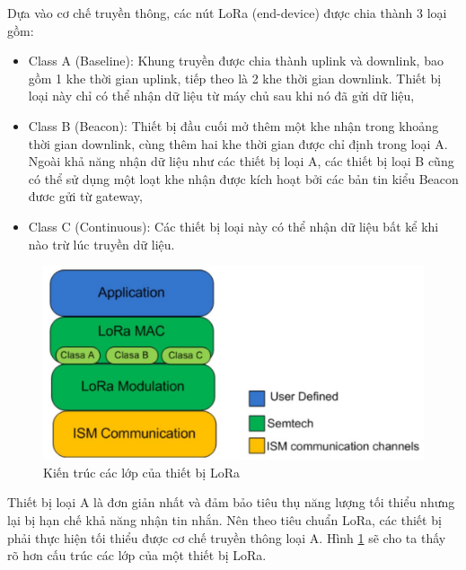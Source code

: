 \par 
Dựa vào cơ chế truyền thông, các nút LoRa (end-device) được chia thành 3 loại \cite{4} gồm:
\begin{itemize}
\item	Class A (Baseline): Khung truyền được chia thành uplink và downlink, bao gồm 1 khe thời gian uplink, tiếp theo là 2 khe thời gian downlink. Thiết bị loại này chỉ có thể nhận dữ liệu từ máy chủ sau khi nó đã gửi dữ liệu,
\item Class B (Beacon): Thiết bị đầu cuối mở thêm một khe nhận trong khoảng thời gian downlink, cùng thêm hai khe thời gian được chỉ định trong loại A. Ngoài khả năng nhận dữ liệu như các thiết bị loại A, các thiết bị loại B cũng có thể sử dụng một loạt khe nhận được kích hoạt bởi các bản tin kiểu Beacon đươc gửi từ gateway,
\item	Class C (Continuous): Các thiết bị loại này có thể nhận dữ liệu bất kể khi nào trừ lúc truyền dữ liệu.
\end{itemize}
    \begin{figure}[h]
    \begin{center}
     \includegraphics[scale=0.43]{image/hinh2_3}
    \end{center}
    \caption{Kiến trúc các lớp của thiết bị LoRa \cite{4}}
    \label{refhinh2_3}
    \end{figure}
Thiết bị loại A là đơn giản nhất và đảm bảo tiêu thụ năng lượng tối thiểu nhưng lại bị hạn chế khả năng nhận tin nhắn. Nên theo tiêu chuẩn LoRa, các thiết bị phải thực hiện tối thiểu được cơ chế truyền thông loại A. Hình \ref{refhinh2_3} sẽ cho ta thấy rõ hơn cấu trúc các lớp của một thiết bị LoRa.
